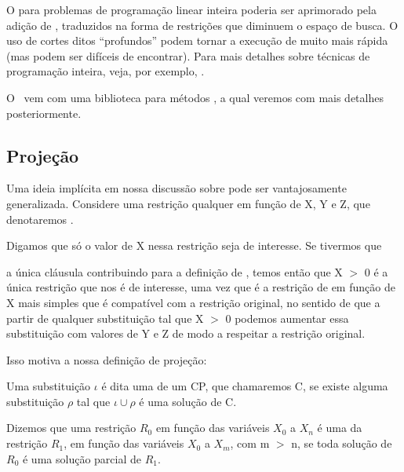 O  para problemas de programação linear inteira poderia ser aprimorado
pela adição de , traduzidos na forma de restrições que diminuem o espaço
de busca. O uso de cortes ditos ``profundos'' podem tornar a execução de  muito mais rápida (mas podem ser difíceis de encontrar). Para mais detalhes sobre técnicas
de programação inteira, veja, por exemplo, \cite{tsitsiklis}.

O \eclipse\ vem com uma biblioteca para métodos , a qual veremos com mais
detalhes posteriormente.

\subsection{Projeção}

Uma ideia implícita em nossa discussão sobre  pode ser vantajosamente generalizada. Considere uma restrição qualquer em função de X, Y e Z, que denotaremos .

Digamos que só o valor de X nessa restrição seja de interesse. Se tivermos que


 a única cláusula contribuindo para a definição de , temos então que X $>$ 0
é a única restrição que nos é de interesse, uma vez que é a restrição de em função de X mais simples que é compatível com a restrição original, no sentido de que a partir de qualquer substituição tal que X $>$ 0 podemos aumentar essa substituição com valores de Y e Z de modo a respeitar a restrição original.

Isso motiva a nossa definição de projeção:

\begin{definition}
  Uma substituição $\iota$ é dita uma  de um CP, que chamaremos C, se existe alguma substituição $\rho$ tal que $\iota \cup \rho$ é uma solução de C.
\end{definition}

\begin{definition}
  Dizemos que uma restrição $R_0$ em função das variáveis $X_0$ a $X_n$ é uma  da restrição $R_1$, em função das variáveis $X_0$ a $X_m$, com m $>$ n, se toda solução de $R_0$ é uma solução parcial de $R_1$.
\end{definition}

